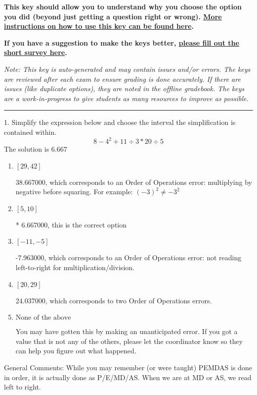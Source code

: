 \documentclass{extbook}[14pt]
\begin{document}
\textbf{This key should allow you to understand why you choose the option you did (beyond just getting a question right or wrong). \href{https://xronos.clas.ufl.edu/mac1105spring2020/courseDescriptionAndMisc/Exams/LearningFromResults}{More instructions on how to use this key can be found here}.}

\textbf{If you have a suggestion to make the keys better, \href{https://forms.gle/CZkbZmPbC9XALEE88}{please fill out the short survey here}.}

\textit{Note: This key is auto-generated and may contain issues and/or errors. The keys are reviewed after each exam to ensure grading is done accurately. If there are issues (like duplicate options), they are noted in the offline gradebook. The keys are a work-in-progress to give students as many resources to improve as possible.}

\rule{\textwidth}{0.4pt}

1. Simplify the expression below and choose the interval the simplification is contained within.
\[ 8 - 4^2 + 11 \div 3 * 20 \div 5 \] 
The solution is $ 6.667 $ 

\begin{enumerate}[label=\Alph*.] 
\item $ [29, 42] $ 

  38.667000, which corresponds to an Order of Operations error: multiplying by negative before squaring. For example: $(-3)^2 \neq -3^2$ 
\item $ [5, 10] $ 

 * 6.667000, this is the correct option 
\item $ [-11, -5] $ 

  -7.963000, which corresponds to an Order of Operations error: not reading left-to-right for multiplication/division. 
\item $ [20, 29] $ 

  24.037000, which corresponds to two Order of Operations errors. 
\item $ \text{None of the above} $ 

  You may have gotten this by making an unanticipated error. If you got a value that is not any of the others, please let the coordinator know so they can help you figure out what happened. 
\end{enumerate} 
 
General Comments: While you may remember (or were taught) PEMDAS is done in order, it is actually done as P/E/MD/AS. When we are at MD or AS, we read left to right.
\end{document}
